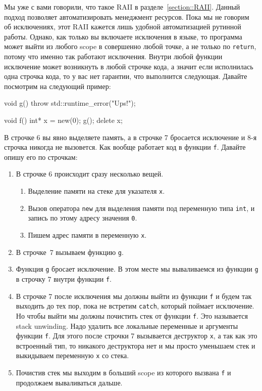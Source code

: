 Мы уже с вами говорили, что такое RAII в разделе~\ref{section::RAII}.
Данный подход позволяет автоматизировать менеджмент ресурсов.
Пока мы не говорим об исключениях, этот RAII кажется лишь удобной автоматизацией рутинной работы.
Однако, как только вы включаете исключения в языке, то  программа может выйти из любого scope в совершенно любой точке, а не только по \verb"return", потому что именно так работают исключения.
Внутри любой функции исключение может возникнуть в любой строчке кода, а значит если исполнилась одна строчка кода, то у вас нет гарантии, что выполнится следующая.
Давайте посмотрим на следующий пример:
\begin{cppcode}
void g() {
  throw std::runtime_error("Ups!");
}

void f() {
  int* x = new(0);
  g();
  delete x;
}
\end{cppcode}
В строчке 6 вы явно выделяете память, а в строчке 7 бросается исключение и 8-я строчка никогда не вызовется.
Как вообще работает код в функции \verb"f".
Давайте опишу его по строчкам:
\begin{enumerate}
\item В строчке 6 происходит сразу несколько вещей.

\begin{enumerate}
\item Выделение памяти  на стеке для указателя \verb"x".

\item Вызов оператора \verb"new" для выделения памяти под переменную типа \verb"int", и запись по этому адресу значения \verb"0".

\item Пишем адрес памяти в переменную \verb"x".
\end{enumerate}

\item В строчке~7 вызываем функцию \verb"g".

\item Функция \verb"g" бросает исключение.
В этом месте мы вываливаемся из функции \verb"g" в строчку 7 внутри функции \verb"f".

\item В строчке 7 после исключения мы должны выйти из функции \verb"f" и будем так выходить до тех пор, пока не встретим \verb"catch", который поймает исключение.
Но чтобы выйти мы должны почистить стек от функции \verb"f".
Это называется stack unwinding.
Надо удалить все локальные переменные и аргументы функции \verb"f".
Для этого после строчки 7 вызывается деструктор \verb"x", а так как это встроенный тип, то никакого деструктора нет и мы просто уменьшаем стек и выкидываем переменную \verb"x" со стека.

\item Почистив стек мы выходим в больший scope из которого вызвана \verb"f" и продолжаем вываливаться дальше.
\end{enumerate}

